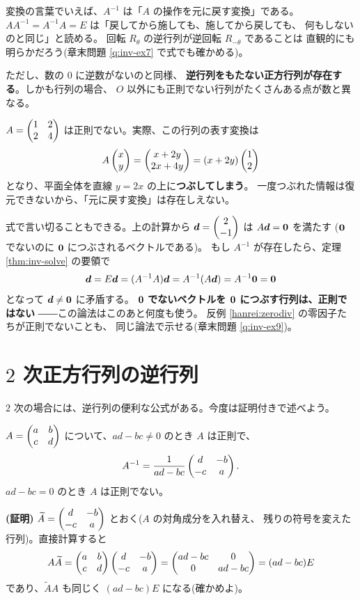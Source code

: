 変換の言葉でいえば、$A^{-1}$ は「$A$ の操作を元に戻す変換」である。
$AA^{-1} = A^{-1}A = E$ は「戻してから施しても、施してから戻しても、
何もしないのと同じ」と読める。
回転 $R_\theta$ の逆行列が逆回転 $R_{-\theta}$ であることは
直観的にも明らかだろう(章末問題 \ref{q:inv-ex7} で式でも確かめる)。

ただし、数の $0$ に逆数がないのと同様、
\textbf{逆行列をもたない正方行列が存在する}。しかも行列の場合、
$O$ 以外にも正則でない行列がたくさんある点が数と異なる。

\begin{rei}[正則でない行列]\label{rei:notinv}
$A = \begin{pmatrix}1 & 2 \\ 2 & 4\end{pmatrix}$ は正則でない。実際、この行列の表す変換は
\[
A\begin{pmatrix}x \\ y\end{pmatrix} = \begin{pmatrix}x + 2y \\ 2x + 4y\end{pmatrix} = (x + 2y)\begin{pmatrix}1 \\ 2\end{pmatrix}
\]
となり、平面全体を直線 $y = 2x$ の上に\textbf{つぶしてしまう}。
一度つぶれた情報は復元できないから、「元に戻す変換」は存在しえない。

式で言い切ることもできる。上の計算から
$\bm{d} = \begin{pmatrix}2 \\ -1\end{pmatrix}$ は $A\bm{d} = \bm{0}$ を満たす
($\bm{0}$ でないのに $\bm{0}$ につぶされるベクトルである)。
もし $A^{-1}$ が存在したら、定理 \ref{thm:inv-solve} の要領で
\[
\bm{d} = E\bm{d} = (A^{-1}A)\bm{d} = A^{-1}(A\bm{d})
= A^{-1}\bm{0} = \bm{0}
\]
となって $\bm{d} \neq \bm{0}$ に矛盾する。
\textbf{$\bm{0}$ でないベクトルを $\bm{0}$ につぶす行列は、正則ではない}
――この論法はこのあと何度も使う。
反例 \ref{hanrei:zerodiv} の零因子たちが正則でないことも、
同じ論法で示せる(章末問題 \ref{q:inv-ex9})。
\end{rei}

\section{$2$ 次正方行列の逆行列}

$2$ 次の場合には、逆行列の便利な公式がある。今度は証明付きで述べよう。

\begin{teiri}[$2$ 次の逆行列公式]\label{thm:inv2x2}
$A = \begin{pmatrix}a & b \\ c & d\end{pmatrix}$ について、$ad - bc \neq 0$ のとき $A$ は正則で、
\[
A^{-1} = \frac{1}{ad - bc} \begin{pmatrix}d & -b \\ -c & a\end{pmatrix}.
\]
$ad - bc = 0$ のとき $A$ は正則でない。
\end{teiri}

\noindent\textbf{(証明)}\quad
$\widetilde{A} = \begin{pmatrix}d & -b \\ -c & a\end{pmatrix}$ とおく($A$ の対角成分を入れ替え、
残りの符号を変えた行列)。直接計算すると
\[
A\widetilde{A} = \begin{pmatrix}a & b \\ c & d\end{pmatrix}\begin{pmatrix}d & -b \\ -c & a\end{pmatrix}
= \begin{pmatrix}ad - bc & 0 \\ 0 & ad - bc\end{pmatrix} = (ad - bc)E
\]
であり、$\widetilde{A}A$ も同じく $(ad - bc)E$ になる(確かめよ)。

